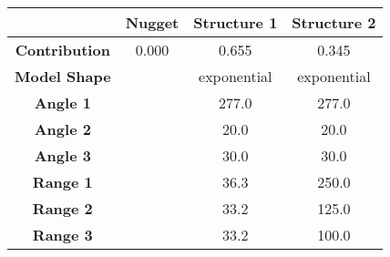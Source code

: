 \begin{tabular}{cccc}
\toprule
{} & Nugget &  Structure 1 &  Structure 2 \\
\midrule
\textbf{Contribution} &  0.000 &        0.655 &        0.345 \\
\textbf{Model Shape } &        &  exponential &  exponential \\
\textbf{Angle 1     } &        &        277.0 &        277.0 \\
\textbf{Angle 2     } &        &         20.0 &         20.0 \\
\textbf{Angle 3     } &        &         30.0 &         30.0 \\
\textbf{Range 1     } &        &         36.3 &        250.0 \\
\textbf{Range 2     } &        &         33.2 &        125.0 \\
\textbf{Range 3     } &        &         33.2 &        100.0 \\
\bottomrule
\end{tabular}
